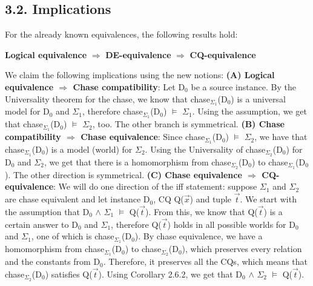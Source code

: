 \documentclass[11pt, a4paper, dvipsnames]{article}
\begin{document}
\subsection{3.2. Implications}
For the already known equivalences, the following results hold:
\begin{center}
\textbf{Logical equivalence} $\Rightarrow$ \textbf{DE-equivalence} $\Rightarrow$ \textbf{CQ-equivalence}
\end{center}
We claim the following implications using the new notions:\newline
\textbf{(A) Logical equivalence $\Rightarrow$ Chase compatibility}:\newline
Let D$_{0}$ be a source instance. By the Universality theorem for the chase, we know that chase$_{\Sigma_{1}}$(D$_{0}$) is a universal model for D$_{0}$ and $\Sigma_{1}$, therefore chase$_{\Sigma_{1}}$(D$_{0}$) $\vDash$ $\Sigma_{1}$. Using the assumption, we get that chase$_{\Sigma_{1}}$(D$_{0}$) $\vDash$ $\Sigma_{2}$, too. The other branch is symmetrical.\newline
\textbf{(B) Chase compatibility $\Rightarrow$ Chase equivalence}:\newline
Since chase$_{\Sigma_{1}}$(D$_{0}$) $\vDash$ $\Sigma_{2}$, we have that chase$_{\Sigma_{1}}$(D$_{0}$) is a model (world) for $\Sigma_{2}$. Using the Universality of chase$_{\Sigma_{2}}$(D$_{0}$) for D$_{0}$ and $\Sigma_{2}$, we get that there is a homomorphism from chase$_{\Sigma_{2}}$(D$_{0}$) to chase$_{\Sigma_{1}}$(D$_{0}$). The other direction is symmetrical.\newline
\textbf{(C) Chase equivalence $\Rightarrow$ CQ-equivalence}:\newline
We will do one direction of the iff statement: suppose $\Sigma_{1}$ and $\Sigma_{2}$ are chase equivalent and let instance D$_{0}$, CQ Q($\vec{x}$) and tuple $\vec{t}$. We start with the assumption that D$_{0}$ $\wedge$ $\Sigma_{1}$ $\vDash$ Q($\vec{t}$). From this, we know that Q($\vec{t}$) is a certain answer to D$_{0}$ and $\Sigma_{1}$, therefore Q($\vec{t}$) holds in all possible worlds for D$_{0}$ and $\Sigma_{1}$, one of which is chase$_{\Sigma_{1}}$(D$_{0}$). By chase equivalence, we have a homomorphism
from chase$_{\Sigma_{1}}$(D$_{0}$) to chase$_{\Sigma_{2}}$(D$_{0}$), which preserves every relation and the constants from D$_{0}$. Therefore, it preserves all the CQs, which means that chase$_{\Sigma_{2}}$(D$_{0}$) satisfies Q($\vec{t}$). Using Corollary 2.6.2, we get that D$_{0}$ $\wedge$ $\Sigma_{2}$ $\vDash$ Q($\vec{t}$).\newline
\end{document}
